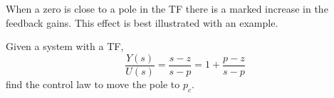 When a zero is close to a pole in the TF there is a marked increase in the feedback gains. This effect is best illustrated with an example.

Given a system with a TF,
\[
\frac{Y(s)}{U(s)}=\frac{s-z}{s-p}=1+\frac{p-z}{s-p}
\]
find the control law to move the pole to $p_c$.



\endinput

